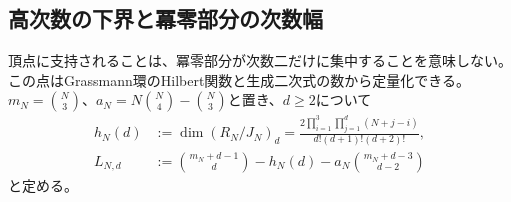 \subsection{高次数の下界と冪零部分の次数幅}

頂点に支持されることは、冪零部分が次数二だけに集中することを意味しない。
この点はGrassmann環のHilbert関数と生成二次式の数から定量化できる。
$m_N=\binom N3$、$a_N=N\binom N4-\binom N3$と置き、$d\ge2$について
\begin{align}
 h_N(d)&:=\dim(R_N/J_N)_d
 =\frac{2\prod_{i=1}^3\prod_{j=1}^d(N+j-i)}{d!(d+1)!(d+2)!},
 \label{eq:nfold-grassmann-hilbert}\\
 L_{N,d}&:=\binom{m_N+d-1}{d}-h_N(d)
            -a_N\binom{m_N+d-3}{d-2}
 \label{eq:nfold-higher-defect}
\end{align}
と定める。

